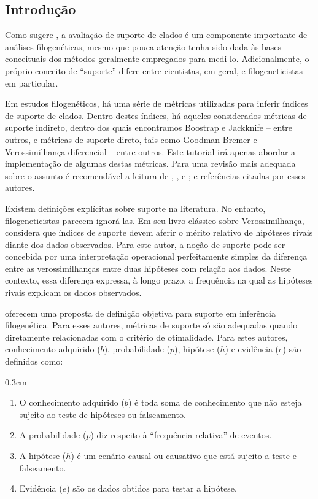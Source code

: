 \begin{refsection}
\section{Introdução}\label{tut14:intro}

Como sugere \textcite[][]{GrantKluge2008b}, a avaliação de suporte de clados é um componente importante de análises filogenéticas, mesmo que pouca atenção tenha sido dada às bases conceituais dos métodos geralmente empregados para medi-lo. Adicionalmente, o próprio conceito de ``suporte'' difere entre cientistas, em geral, e filogeneticistas em particular. 

Em estudos filogenéticos, há uma série de métricas utilizadas para inferir índices de suporte de clados. Dentro destes índices, há aqueles considerados métricas de suporte indireto, dentro dos quais encontramos Boostrap e Jackknife -- entre outros, e métricas de suporte direto, tais como Goodman-Bremer e Verossimilhança diferencial -- entre outros. Este tutorial irá apenas abordar a implementação de algumas destas métricas. Para uma revisão mais adequada sobre o assunto é recomendável a leitura de \textcite{Siddall_2001}, \textcite{Egan_2006}, \textcite{GrantKluge2008b} e \textcite{Wheeler_2012}; e referências citadas por esses autores. 

Existem definições explícitas sobre suporte na literatura. No entanto, filogeneticistas parecem ignorá-las. Em seu livro clássico sobre Verossimilhança, \textcite{Edwards_1992} considera que índices de suporte devem aferir o mérito relativo de hipóteses rivais diante dos dados observados. Para este autor, a noção de suporte pode ser concebida por uma interpretação operacional perfeitamente simples da diferença entre as verossimilhanças entre duas hipóteses com relação aos dados. Neste contexto, essa diferença expressa, à longo prazo, a frequência na qual as hipóteses rivais explicam os dados observados.

\textcite{GrantKluge2008b} oferecem uma proposta de definição objetiva para suporte em inferência filogenética. Para esses autores, métricas de suporte só são adequadas quando diretamente relacionadas com o critério de otimalidade. Para estes autores, conhecimento adquirido ($b$), probabilidade ($p$), hipótese ($h$) e evidência ($e$) são definidos como:

\begin {myindentpar}{0.3cm}
\begin{enumerate}[1.]
\item O conhecimento adquirido ($b$) é toda soma de conhecimento que não esteja sujeito ao teste de hipóteses ou falseamento.
\item A probabilidade ($p$) diz respeito à ``frequência relativa'' de eventos.
\item A hipótese ($h$) é um cenário causal ou causativo que está sujeito a teste e falseamento.
\item Evidência ($e$) são os dados obtidos para testar a hipótese.
\end{enumerate}
\end{myindentpar}


\end{refsection}
